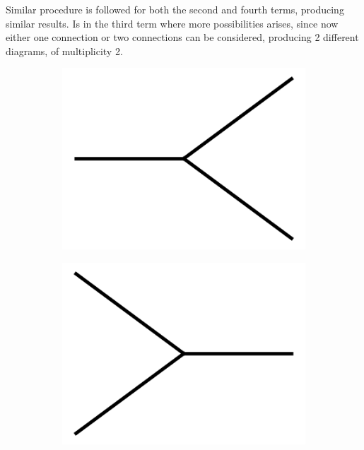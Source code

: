 \documentclass[11pt,a4paper,twoside,pdf]{article}
\numberwithin{equation}{section}
\begin{document}
Similar procedure is followed for both the second and fourth terms, producing similar results.
Is in the third term where more possibilities arises, since now either one 
connection or two connections can be considered, producing 2 different diagrams, of multiplicity 2.

\begin{figure}[h!]
  \centering
    \begin{subfigure}[t]{.1\textwidth}
    \includegraphics[width=\textwidth]{plots/2to1.png}
    \end{subfigure}%
    \begin{subfigure}[t]{.1\textwidth}
    \includegraphics[width=\textwidth]{plots/1to2.png}

\end{subfigure}
\end{figure}
\end{document}
